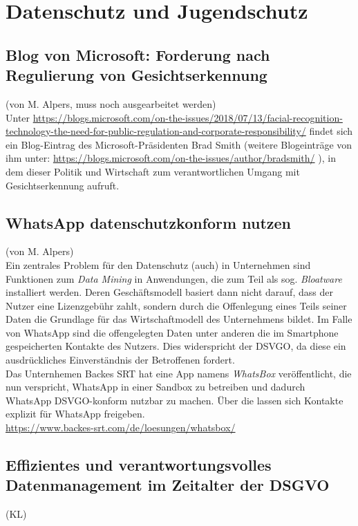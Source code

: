\section*{Datenschutz und Jugendschutz}

\subsection{Blog von Microsoft: Forderung nach Regulierung von Gesichtserkennung}
(von M. Alpers, muss noch ausgearbeitet werden)\\

Unter \url{https://blogs.microsoft.com/on-the-issues/2018/07/13/facial-recognition-technology-the-need-for-public-regulation-and-corporate-responsibility/} findet sich ein Blog-Eintrag des Microsoft-Präsidenten Brad Smith (weitere Blogeinträge von ihm unter: \url{https://blogs.microsoft.com/on-the-issues/author/bradsmith/} ), in dem dieser Politik und Wirtschaft zum verantwortlichen Umgang mit Gesichtserkennung aufruft.

\subsection{WhatsApp datenschutzkonform nutzen}
(von M. Alpers)\\

Ein zentrales Problem für den Datenschutz (auch) in Unternehmen sind Funktionen zum \emph{Data Mining} in Anwendungen, die zum Teil als sog. \emph{Bloatware} installiert werden. Deren Geschäftsmodell basiert dann nicht darauf, dass der Nutzer eine Lizenzgebühr zahlt, sondern durch die Offenlegung eines Teils seiner Daten die Grundlage für das Wirtschaftmodell des Unternehmens bildet. Im Falle von WhatsApp sind die offengelegten Daten unter anderen die im Smartphone gespeicherten Kontakte des Nutzers. Dies widerspricht der DSVGO, da diese ein ausdrückliches Einverständnis der Betroffenen fordert.\\

\glqq{}Das Unternhemen  Backes SRT hat eine App namens \emph{WhatsBox} veröffentlicht,\grqq{} die nun verspricht, WhatsApp in einer Sandbox zu betreiben und dadurch WhatsApp DSVGO-konform nutzbar zu machen. Über die lassen sich Kontakte explizit für WhatsApp freigeben.\\

\url{https://www.backes-srt.com/de/loesungen/whatsbox/}


\subsection{Effizientes und verantwortungsvolles
Datenmanagement im
Zeitalter der DSGVO}
(KL)\\

